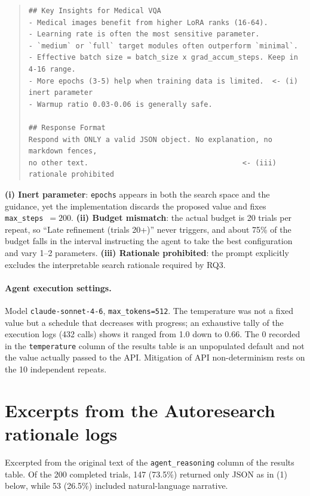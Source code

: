 \begin{quote}
\begin{verbatim}
## Key Insights for Medical VQA
- Medical images benefit from higher LoRA ranks (16-64).
- Learning rate is often the most sensitive parameter.
- `medium` or `full` target modules often outperform `minimal`.
- Effective batch size = batch_size x grad_accum_steps. Keep in 4-16 range.
- More epochs (3-5) help when training data is limited.  <- (i) inert parameter
- Warmup ratio 0.03-0.06 is generally safe.

## Response Format
Respond with ONLY a valid JSON object. No explanation, no markdown fences,
no other text.                                    <- (iii) rationale prohibited
\end{verbatim}
\end{quote}

\noindent
\textbf{(i) Inert parameter}: \texttt{epochs} appears in both the search space and
the guidance, yet the implementation discards the proposed value and fixes
\texttt{max\_steps}~$=200$.
\textbf{(ii) Budget mismatch}: the actual budget is 20 trials per repeat, so
``Late refinement (trials 20+)'' never triggers, and about 75\% of the budget
falls in the interval instructing the agent to take the best configuration and
vary 1--2 parameters.
\textbf{(iii) Rationale prohibited}: the prompt explicitly excludes the
interpretable search rationale required by RQ3.

\paragraph{Agent execution settings.}
Model \texttt{claude-sonnet-4-6}, \texttt{max\_tokens=512}. The temperature was
not a fixed value but a schedule that decreases with progress; an exhaustive tally
of the execution logs (432 calls) shows it ranged from 1.0 down to 0.66. The 0
recorded in the \texttt{temperature} column of the results table is an unpopulated
default and not the value actually passed to the API. Mitigation of API
non-determinism rests on the 10 independent repeats.

\section{Excerpts from the Autoresearch rationale logs}
\label{app:rationale}

Excerpted from the original text of the \texttt{agent\_reasoning} column of the
results table. Of the 200 completed trials, 147 (73.5\%) returned only JSON as in
(1) below, while 53 (26.5\%) included natural-language narrative.

